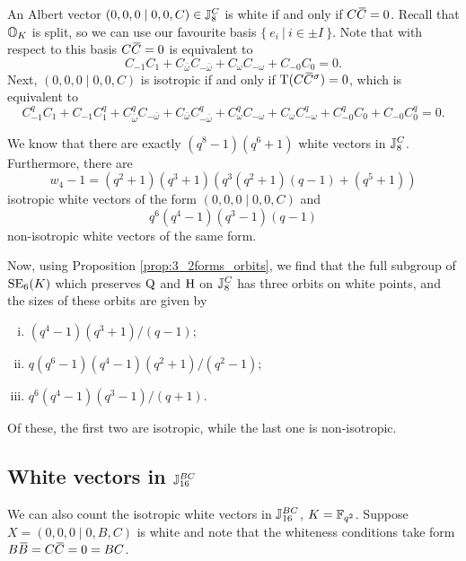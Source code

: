 An Albert vector $(0,0,0\mid 0,0,C) \in \mathbb{J}_8^C$ is white if and only if $C\mathord{\mbox{\hspace*{0pt}}\,\overline{\!C\!\!\;}\!\:}\mbox{\hspace*{0pt}} = 0$. Recall that
$\mathbb{O}_K$ is split, so we can use our favourite basis $\{\ e_i\ \big|\ i \in \pm I\ \}$. Note that
with respect to this basis $C\mathord{\mbox{\hspace*{0pt}}\,\overline{\!C\!\!\;}\!\:}\mbox{\hspace*{0pt}} = 0$ is equivalent to 
\begin{equation}
	C_{-1}C_{1} + C_{\bar{\omega}} C_{-\bar{\omega}} + C_{\omega} C_{-\omega} + C_{-0} C_{0} = 0.
\end{equation}
Next, $(0,0,0\mid 0,0,C)$ is isotropic if and only if $\operatorname{T}(C \mathord{\mbox{\hspace*{0pt}}\,\overline{\!C\!\!\;}\!\:}\mbox{\hspace*{0pt}}^{\sigma}) = 0$, which is equivalent
to
\begin{equation}
	C_{-1}^qC_{1} + C_{-1}C_{1}^q + 
	C_{\bar{\omega}}^q C_{-\bar{\omega}} + C_{\bar{\omega}} C_{-\bar{\omega}}^q + 
	C_{\omega}^q C_{-\omega} + C_{\omega} C_{-\omega}^q + 
	C_{-0}^q C_{0} + C_{-0} C_{0}^q = 0.
\end{equation}

We know that there are exactly $(q^8-1)(q^6+1)$ white vectors in $\mathbb{J}_8^C$. Furthermore,
there are
\begin{equation}
	w_4 - 1 = (q^2+1)(q^3+1)(q^3(q^2+1)(q-1)+(q^5+1))
\end{equation}
isotropic white vectors of the form $(0,0,0 \mid 0,0,C)$ and
\begin{equation}
q^6(q^4-1)(q^3-1)(q-1)
\end{equation}
non-isotropic white vectors of the same form.

Now, using Proposition \ref{prop:3_2forms_orbits}, we find that the full subgroup of 
$\mathrm{SE}_6(K)$ which preserves $\mathord{\mathrm{Q}}$ 
and
$\mathrm{H}$ on $\mathbb{J}_8^C$ has three orbits on white points, and the sizes of these orbits are given by
\begin{enumerate}[(i)]
	\item $(q^4-1)(q^3+1)/(q-1)$;
	\item $q(q^6-1)(q^4-1)(q^2+1)/(q^2-1)$;
	\item $q^6 (q^4-1)(q^3-1)/(q+1)$.
\end{enumerate}
Of these, the first two are isotropic, while the last one is non-isotropic. 

\subsection{White vectors in $\mathbb{J}_{16}^{BC}$}

We can also count the isotropic white vectors in $\mathbb{J}_{16}^{BC}$, $K = \mathbb{F}_{q^2}$. Suppose 
\mbox{$X = (0,0,0\mid 0,B,C)$} is white and note that the whiteness conditions 
take form $B\ovB = C\ovC = 0 = BC$. 

